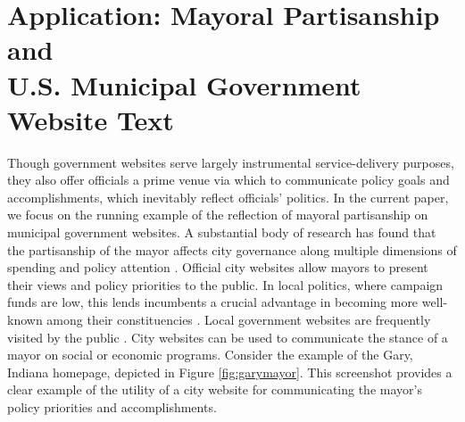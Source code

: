 \documentclass[11pt]{article}
\begin{document}

\vspace{-.2cm}

\section{Application: Mayoral Partisanship and \\ U.S. Municipal Government Website Text} \vspace{-.2cm}


 Though government websites serve largely instrumental service-delivery purposes, they also offer officials a prime venue via which to communicate policy goals and accomplishments, which inevitably reflect officials' politics. In the current paper, we focus on the running example of the reflection of mayoral partisanship on municipal government websites. A substantial body of research has found that the partisanship of the mayor affects city governance along multiple dimensions of spending and policy attention \citep{gerber2011mayors,de2016mayoral,einstein2016mayors,marion2013mayor}. Official city websites allow mayors to present their views and policy priorities to the public. In local politics, where campaign funds are low, this lends incumbents a crucial advantage in becoming more well-known among their constituencies \citep{stanyer2008elected}. Local government websites are frequently visited by the public \citep{thomas2003new}. City websites can be used to communicate the stance of a mayor on social or economic programs. Consider the example of the Gary, Indiana homepage, depicted in Figure \ref{fig:garymayor}.  This screenshot provides a clear example of the utility of a city website for communicating the mayor's policy priorities and accomplishments.
 
\end{document}
